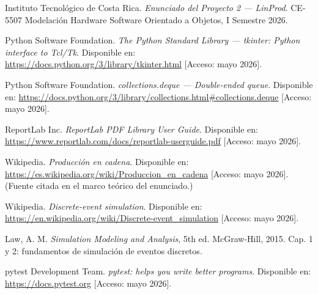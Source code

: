 \documentclass[12pt,letterpaper]{article}
\begin{document}
\begin{enumerate}[leftmargin=2em, label={[\arabic*]}]

  \item Instituto Tecnológico de Costa Rica. \textit{Enunciado del Proyecto 2 — LinProd}.
    CE-5507 Modelación Hardware Software Orientado a Objetos, I Semestre 2026.

  \item Python Software Foundation. \textit{The Python Standard Library — tkinter:
    Python interface to Tcl/Tk}. Disponible en: \url{https://docs.python.org/3/library/tkinter.html}
    [Acceso: mayo 2026].

  \item Python Software Foundation. \textit{collections.deque — Double-ended queue}.
    Disponible en: \url{https://docs.python.org/3/library/collections.html#collections.deque}
    [Acceso: mayo 2026].

  \item ReportLab Inc. \textit{ReportLab PDF Library User Guide}. Disponible en:
    \url{https://www.reportlab.com/docs/reportlab-userguide.pdf} [Acceso: mayo 2026].

  \item Wikipedia. \textit{Producción en cadena}. Disponible en:
    \url{https://es.wikipedia.org/wiki/Produccion_en_cadena} [Acceso: mayo 2026].
    (Fuente citada en el marco teórico del enunciado.)

  \item Wikipedia. \textit{Discrete-event simulation}. Disponible en:
    \url{https://en.wikipedia.org/wiki/Discrete-event_simulation} [Acceso: mayo 2026].

  \item Law, A. M. \textit{Simulation Modeling and Analysis}, 5th ed. McGraw-Hill, 2015.
    Cap. 1 y 2: fundamentos de simulación de eventos discretos.

  \item pytest Development Team. \textit{pytest: helps you write better programs}.
    Disponible en: \url{https://docs.pytest.org} [Acceso: mayo 2026].

\end{enumerate}
\end{document}
